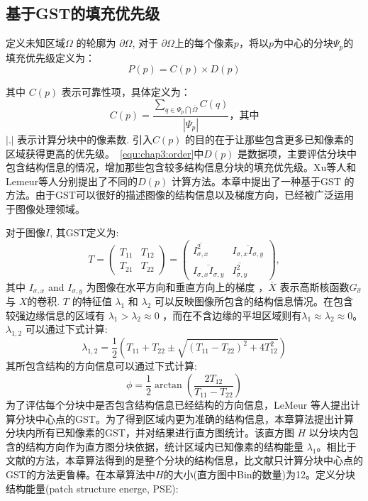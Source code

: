  \subsection{基于GST的填充优先级}
 \label{sec:sub:GST}

 定义未知区域\(\Omega\) 的轮廓为 \(\partial\Omega\), 对于 \(\partial\Omega\)上的每个像素\(p\)，将以\(p\)为中心的分块\(\Psi_p\)的填充优先级定义为：
 \begin{equation}
    \label{equ:chap3:order}
    P(p)=C(p)\times D(p)
 \end{equation}

 其中 \(C(p)\) 表示可靠性项\cite{Criminisi04regionfilling}，具体定义为： $$C(p)=\frac{\sum_{q\in\Psi_p\bigcap\overline{\Omega}}{C(q)}}{\left\vert{\Psi_p}\right\vert}，其中$$\(\left\vert.\right\vert\)  表示计算分块中的像素数. 引入\(C(p)\) 的目的在于让那些包含更多已知像素的区域获得更高的优先级。~\ref{equ:chap3:order}中\(D(p)\) 是数据项，主要评估分块中包含结构信息的情况，增加那些包含较多结构信息分块的填充优先级。Xu等人\cite{Xu:2010}和Lemeur等人\cite{LeMeur_2011}分别提出了不同的\(D(p)\) 计算方法。本章中提出了一种基于GST 的方法。由于GST可以很好的描述图像的结构信息以及梯度方向，已经被广泛运用于图像处理领域\cite{Kothe03edgeand}。 \par
  对于图像\(I\), 其GST定义为:
  $$T=\left(\begin{array}{cc}T_{11} & T_{12} \\ T_{21} &T_{22}\end{array}\right)=\left(\begin{array}{cc}\overline{I_{\sigma,x}^2} & \overline{I_{\sigma,x}I_{\sigma,y}} \\ \overline{I_{\sigma,x}I_{\sigma,y}} & \overline{I_{\sigma,y}^2}\end{array}\right),$$
  其中 \(I_{\sigma,x}\) and \(I_{\sigma,y}\)  为图像在水平方向和垂直方向上的梯度 ，\(\overline{X}\) 表示高斯核函数\(G_{\hat{\sigma}}\) 与 \(X\)的卷积. \(T\) 的特征值 \(\lambda_1\) 和 \(\lambda_2\) 可以反映图像所包含的结构信息情况。在包含较强边缘信息的区域有 \(\lambda_1>\lambda_2\approx0\) ，而在不含边缘的平坦区域则有\(\lambda_1\approx\lambda_2\approx0\)。 \( \lambda_{1,2} \) 可以通过下式计算: $$\lambda_{1,2}=\frac{1}{2}\left(T_{11}+T_{22}\pm\sqrt{\left(T_{11}-T_{22}\right)^2+4T^2_{12}}\right)$$
  其所包含结构的方向信息可以通过下式计算:
 $$\phi=\frac{1}{2}\arctan{\left(\frac{2T_{12}}{T_{11}-T_{22}}\right)}$$
 为了评估每个分块中是否包含结构信息已经结构的方向信息，LeMeur
 等人\cite{LeMeur_2011}提出计算分块中心点的GST。为了得到区域内更为准确的结构信息，本章算法提出计算分块内所有已知像素的GST，并对结果进行直方图统计。该直方图 \(H\) 以分块内包含的结构方向作为直方图分块依据，统计区域内已知像素的结构能量 \(\lambda_1\)。相比于文献\cite{LeMeur_2011}的方法，本章算法得到的是整个分块的结构信息，比文献\cite{LeMeur_2011}只计算分块中心点的GST的方法更鲁棒。在本章算法中\(H\)的大小(直方图中Bin的数量)为12。定义分块结构能量(patch structure energe, PSE):
